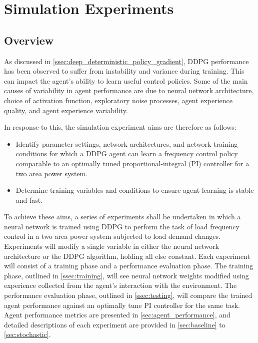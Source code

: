 \section{Simulation Experiments}\label{sec:simulation_experiments}
\subsection{Overview}
As discussed in \textsection \ref{ssec:deep_deterministic_policy_gradient}, DDPG performance has been observed to suffer from instability and variance during training. This can impact the agent's ability to learn useful control policies. Some of the main causes of variability in agent performance are due to neural network architecture, choice of activation function, exploratory noise processes, agent experience quality, and agent experience variability.

In response to this, the simulation experiment aims are therefore as follows:
\begin{itemize}
	\item Identify parameter settings, network architectures, and network training conditions for which a DDPG agent can learn a frequency control policy comparable to an optimally tuned proportional-integral (PI) controller for a two area power system.
	\item Determine training variables and conditions to ensure agent learning is stable and fast.
\end{itemize}

To achieve these aims, a series of experiments shall be undertaken in which a neural network is trained using DDPG to perform the task of load frequency control in a two area power system subjected to load demand changes. Experiments will modify a single variable in either the neural network architecture or the DDPG algorithm, holding all else constant. Each experiment will consist of a training phase and a performance evaluation phase. The training phase, outlined in \textsection \ref{ssec:training}, will see neural network weights modified using experience collected from the agent's interaction with the environment. The performance evaluation phase, outlined in \textsection \ref{ssec:testing}, will compare the trained agent performance against an optimally tune PI controller for the same task. Agent performance metrics are presented in \textsection \ref{sec:agent_performance}, and detailed descriptions of each experiment are provided in \textsection \ref{sec:baseline} to \ref{sec:stochastic}.

